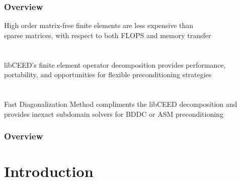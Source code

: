 \documentclass{beamer}
\begin{document}
\begin{frame}
\begin{center}
\frametitle{Overview}

High order matrix-free finite elements are less expensive than\\
sparse matrices, with respect to both FLOPS and memory transfer\\

~\\

~\\

libCEED's finite element operator decomposition provides performance,\\
portability, and opportunities for flexible preconditioning strategies\\

~\\

~\\

Fast Diagonalization Method compliments the libCEED decomposition and\\
provides inexact subdomain solvers for BDDC or ASM preconditioning

\end{center}
\end{frame}
 

\begin{frame}
\frametitle{Overview} %
\tableofcontents
\end{frame}


\section{Introduction}
\end{document}
